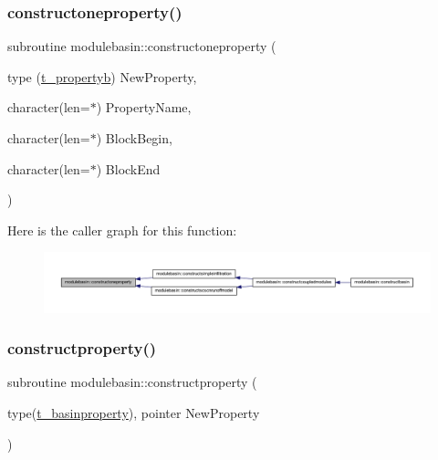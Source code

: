 \subsubsection{\texorpdfstring{constructoneproperty()}{constructoneproperty()}}
{\footnotesize\ttfamily subroutine modulebasin\+::constructoneproperty (\begin{DoxyParamCaption}\item[{type (\mbox{\hyperlink{structmodulebasin_1_1t__propertyb}{t\+\_\+propertyb}})}]{New\+Property,  }\item[{character(len=$\ast$)}]{Property\+Name,  }\item[{character(len=$\ast$)}]{Block\+Begin,  }\item[{character(len=$\ast$)}]{Block\+End }\end{DoxyParamCaption})\hspace{0.3cm}{\ttfamily [private]}}

Here is the caller graph for this function\+:\nopagebreak
\begin{figure}[H]
\begin{center}
\leavevmode
\includegraphics[width=350pt]{namespacemodulebasin_a5a3aa456544a0c67f38a3d3655071347_icgraph}
\end{center}
\end{figure}
\mbox{\label{namespacemodulebasin_afc1a708f812fbecd655d2ec2ec7d7ae7}} 
\subsubsection{\texorpdfstring{constructproperty()}{constructproperty()}}
{\footnotesize\ttfamily subroutine modulebasin\+::constructproperty (\begin{DoxyParamCaption}\item[{type(\mbox{\hyperlink{structmodulebasin_1_1t__basinproperty}{t\+\_\+basinproperty}}), pointer}]{New\+Property }\end{DoxyParamCaption})\hspace{0.3cm}{\ttfamily [private]}}


